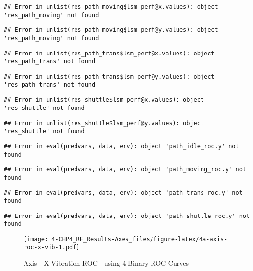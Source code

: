 \documentclass[]{article}
\begin{document}
\begin{verbatim}
## Error in unlist(res_path_moving$lsm_perf@x.values): object 'res_path_moving' not found
\end{verbatim}

\begin{verbatim}
## Error in unlist(res_path_moving$lsm_perf@y.values): object 'res_path_moving' not found
\end{verbatim}

\begin{verbatim}
## Error in unlist(res_path_trans$lsm_perf@x.values): object 'res_path_trans' not found
\end{verbatim}

\begin{verbatim}
## Error in unlist(res_path_trans$lsm_perf@y.values): object 'res_path_trans' not found
\end{verbatim}

\begin{verbatim}
## Error in unlist(res_shuttle$lsm_perf@x.values): object 'res_shuttle' not found
\end{verbatim}

\begin{verbatim}
## Error in unlist(res_shuttle$lsm_perf@y.values): object 'res_shuttle' not found
\end{verbatim}

\begin{verbatim}
## Error in eval(predvars, data, env): object 'path_idle_roc.y' not found
\end{verbatim}

\begin{verbatim}
## Error in eval(predvars, data, env): object 'path_moving_roc.y' not found
\end{verbatim}

\begin{verbatim}
## Error in eval(predvars, data, env): object 'path_trans_roc.y' not found
\end{verbatim}

\begin{verbatim}
## Error in eval(predvars, data, env): object 'path_shuttle_roc.y' not found
\end{verbatim}

\begin{figure}
\centering
\texttt{[image: 4-CHP4\_RF\_Results-Axes\_files/figure-latex/4a-axis-roc-x-vib-1.pdf]}
\caption{Axis - X Vibration ROC - using 4 Binary ROC Curves}
\end{figure}
\end{document}

